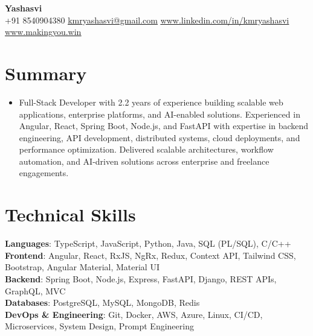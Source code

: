 \documentclass[letterpaper,11pt]{article}
\newcommand{\resumeItem}[1]{\item\small{{#1 \vspace{-2pt}}}}
\newcommand{\resumeSubHeadingListStart}{\begin{itemize}[leftmargin=0.0in, label={}]}
\newcommand{\resumeSubHeadingListEnd}{\end{itemize}}
\begin{document}
\begin{center}
    {\Huge\bfseries Yashasvi} \\ \vspace{1pt}
    \small
    +91 8540904380 \hspace{0.5em}\textbar \hspace{0.5em}
    \href{mailto:kmryashasvi@gmail.com}{\underline{kmryashasvi@gmail.com}}
    \hspace{0.5em}\textbar\hspace{0.5em}
    \href{https://linkedin.com/in/kmryashasvi}{\underline{www.linkedin.com/in/kmryashasvi}}
    \hspace{0.5em}\textbar\hspace{0.5em}
    \href{https://makingyou.win}{\underline{www.makingyou.win}}
    \vspace{-8pt}
\end{center}

\section{Summary}
\resumeSubHeadingListStart
\resumeItem{Full-Stack Developer with 2.2 years of experience building scalable web applications, enterprise platforms, and AI-enabled solutions. Experienced in Angular, React, Spring Boot, Node.js, and FastAPI with expertise in backend engineering, API development, distributed systems, cloud deployments, and performance optimization. Delivered scalable architectures, workflow automation, and AI-driven solutions across enterprise and freelance engagements.}
\resumeSubHeadingListEnd
\vspace{-15pt}

\section{Technical Skills}
\begin{itemize}[leftmargin=0.15in, label={}]
\small{\item{
\textbf{Languages}{: TypeScript, JavaScript, Python, Java, SQL (PL/SQL), C/C++} \\
\textbf{Frontend}{: Angular, React, RxJS, NgRx, Redux, Context API, Tailwind CSS, Bootstrap, Angular Material, Material UI} \\
\textbf{Backend}{: Spring Boot, Node.js, Express, FastAPI, Django, REST APIs, GraphQL, MVC} \\
\textbf{Databases}{: PostgreSQL, MySQL, MongoDB, Redis} \\
\textbf{DevOps \& Engineering}{: Git, Docker, AWS, Azure, Linux, CI/CD, Microservices, System Design, Prompt Engineering} 
}}
\end{itemize}
\vspace{-16pt}
\end{document}
